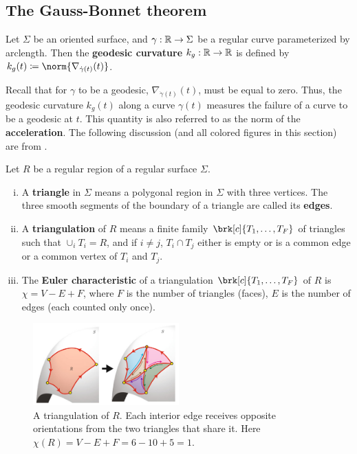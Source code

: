 \subsection{The Gauss-Bonnet theorem}
\begin{definition}[]\label{}
Let $\Sigma$ be an oriented surface, and $\gamma: \mathbb{R} \to \Sigma$ be a regular curve parameterized by arclength. Then the \textbf{geodesic curvature} $k_g:\mathbb{R} \to \mathbb{R}$ is defined by $k_g(t) \defn \norm{\nabla_{\dot{\gamma}(t)}(t)}$.
\end{definition}
Recall that for $\gamma$ to be a geodesic, $\nabla_{\dot{\gamma}(t)}(t)$, must be equal to zero. Thus, the geodesic curvature $k_g(t)$ along a curve $\gamma(t)$ measures the failure of a curve to be a geodesic at $t$. This quantity is also referred to as the norm of the \textbf{acceleration}.
%
The following discussion (and all colored figures in this section) are from \cite{tapp2016differential}.
\begin{definition}[]\label{}
Let $R$ be a regular region of a regular surface $\Sigma$.
\begin{enumerate}[i)]
\item A \textbf{triangle} in $\Sigma$ means a polygonal region in $\Sigma$ with three vertices. The three smooth segments of the boundary of a triangle are called its \textbf{edges}.
\item A \textbf{triangulation} of $R$ means a finite family $\brk[c]{T_1, \ldots, T_F}$ of triangles such that $\cup_i T_i = R$, and if $i \neq j$, $T_i \cap T_j$ either is empty or is a common edge or a common vertex of $T_i$ and $T_j$.
\item The \textbf{Euler characteristic} of a triangulation $\brk[c]{T_1, \ldots, T_F}$ of $R$ is $\chi = V - E + F$, where $F$ is the number of triangles (faces), $E$ is the number of edges (each counted only once).
\end{enumerate}
\end{definition}
\begin{figure}[!htb]
	\centering
	\includegraphics[width=0.5\textwidth]{img/triangulation.png}
	\caption{A triangulation of $R$. Each interior edge receives opposite orientations from the two triangles that share it. Here $\chi(R) = V - E + F = 6 - 10 + 5 = 1$.}
	\label{}
\end{figure}

